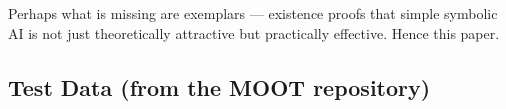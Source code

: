 \documentclass[AMA,STIX2COL]{WileyNJDv5}
\begin{document}
Perhaps what is missing are exemplars — existence proofs that simple symbolic AI is not just theoretically attractive but practically effective. Hence this paper.



 
 
 
\subsection{Test Data (from the MOOT repository)}\label{moot}


 
\end{document}
